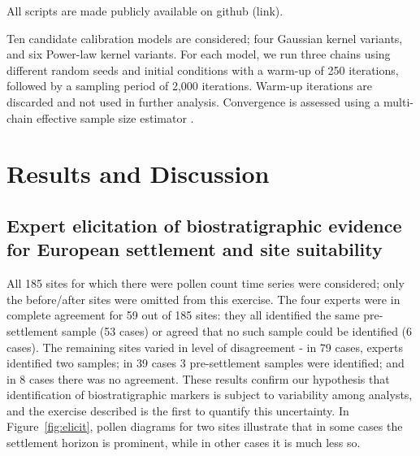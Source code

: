 \documentclass[12pt]{article}
\begin{document}
All scripts are made publicly available on github (link).

Ten candidate calibration models are considered; four Gaussian kernel
variants, and six Power-law kernel variants. For each model, we run
three chains using different random seeds and initial conditions with
a warm-up of 250 iterations, followed by a sampling period of 2,000
iterations. Warm-up iterations are discarded and not used in further
analysis. Convergence is assessed using a multi-chain effective sample
size estimator \citep{gelman2014bayesian, XXX}.




\section{Results and Discussion}

\subsection{Expert elicitation of biostratigraphic evidence for European settlement and site suitability}

All 185 sites for which there were pollen count time series were
considered; only the before/after sites were omitted from this
exercise. The four experts were in complete agreement for 59 out of
185 sites: they all identified the same pre-settlement sample (53
cases) or agreed that no such sample could be identified (6
cases). The remaining sites varied in level of disagreement - in 79
cases, experts identified two samples; in 39 cases 3 pre-settlement
samples were identified; and in 8 cases there was no agreement. These
results confirm our hypothesis that identification of biostratigraphic
markers is subject to variability among analysts, and the exercise
described is the first to quantify this uncertainty. In
Figure~\ref{fig:elicit}, pollen diagrams for two sites illustrate that
in some cases the settlement horizon is prominent, while in other
cases it is much less so.
\end{document}

